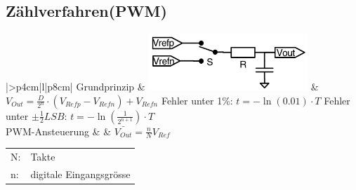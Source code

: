 \subsection{Zählverfahren(PWM)}
\begin{longtable}{|>{\bfseries}p{4cm}|l|p{8cm}|}
	\hline 
	Grundprinzip \hartl{466}
	& \includegraphics[width=6cm, valign=t]{./pictures/pwm_DAC.png}
	& $ V_{Out}=\frac{D}{2^n} \cdot (V_{Refp}-V_{Refn})+V_{Refn} $ \newline
	Fehler unter 1\%: \newline $t = - \ln(0.01) \cdot T$ \newline
	Fehler unter $\pm \frac{1}{2} LSB$: \newline $ t = -\ln(\frac{1}{2^{n+1}}) \cdot T $
	\\ \hline
	PWM-Ansteuerung \hartl{466}
	& \parbox[c][2cm]{6cm}{}
	& $\bar{V_{Out}}=\frac{n}{N}V_{Ref}$
	  \begin{tabular}{ll}
		N:&Takte\\
		n:&digitale Eingangsgrösse
	  \end{tabular}
	\\ \hline
\end{longtable}


